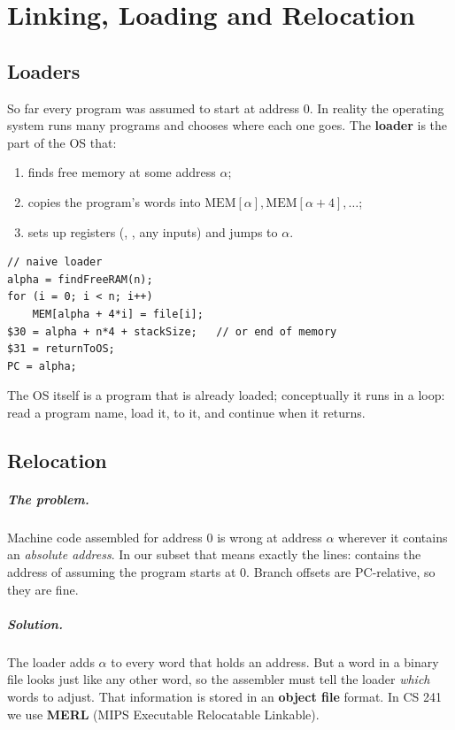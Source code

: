 \chapter{Linking, Loading and Relocation}

\section{Loaders}

So far every program was assumed to start at address 0. In reality the operating system
runs many programs and chooses where each one goes. The \textbf{loader} is the part of the OS
that:
\begin{enumerate}
  \item finds free memory at some address $\alpha$;
  \item copies the program's words into $\mathrm{MEM}[\alpha], \mathrm{MEM}[\alpha+4], \dots$;
  \item sets up registers (, , any inputs) and jumps to $\alpha$.
\end{enumerate}

\begin{lstlisting}[style=c]
// naive loader
alpha = findFreeRAM(n);
for (i = 0; i < n; i++)
    MEM[alpha + 4*i] = file[i];
$30 = alpha + n*4 + stackSize;   // or end of memory
$31 = returnToOS;
PC = alpha;
\end{lstlisting}

The OS itself is a program that is already loaded; conceptually it runs in a loop:
read a program name, load it,  to it, and continue when it returns.

\section{Relocation}

\paragraph{The problem.} Machine code assembled for address 0 is wrong at address $\alpha$
wherever it contains an \emph{absolute address}. In our subset that means exactly the
 lines:  contains the address of  assuming the
program starts at 0. Branch offsets are PC-relative, so they are fine.

\paragraph{Solution.} The loader adds $\alpha$ to every word that holds an address. But a
word in a binary file looks just like any other word, so the assembler must tell the loader
\emph{which} words to adjust. That information is stored in an \textbf{object file} format.
In CS 241 we use \textbf{MERL} (MIPS Executable Relocatable Linkable).

